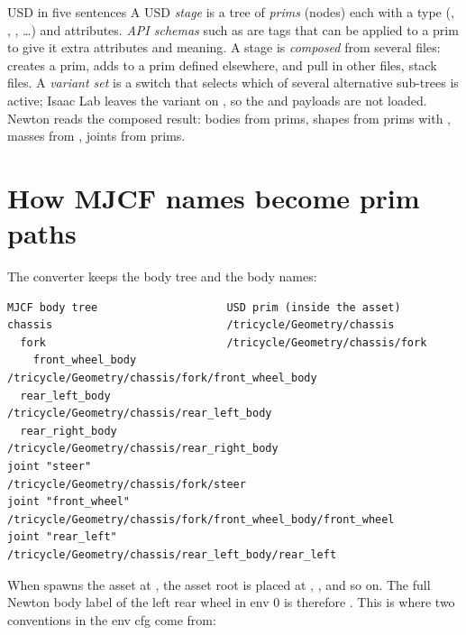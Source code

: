 \begin{isaacbox}{USD in five sentences}
A USD \emph{stage} is a tree of \emph{prims} (nodes) each with a type
(, , , \ldots) and
attributes. \emph{API schemas} such as  are tags that
can be applied to a prim to give it extra attributes and meaning. A stage is
\emph{composed} from several files:  creates a prim,
 adds to a prim defined elsewhere,  and
 pull in other files,  stack files. A
\emph{variant set} is a switch that selects which of several alternative
sub-trees is active; Isaac Lab leaves the  variant on
, so the  and  payloads are not
loaded. Newton reads the composed result: bodies from
 prims, shapes from prims with
, masses from , joints from
 prims.
\end{isaacbox}

\section{How MJCF names become prim paths}
\label{sec:prim_paths}

The converter keeps the body tree and the body names:

\begin{lstlisting}[style=plain,numbers=none]
MJCF body tree                    USD prim (inside the asset)
chassis                           /tricycle/Geometry/chassis
  fork                            /tricycle/Geometry/chassis/fork
    front_wheel_body              /tricycle/Geometry/chassis/fork/front_wheel_body
  rear_left_body                  /tricycle/Geometry/chassis/rear_left_body
  rear_right_body                 /tricycle/Geometry/chassis/rear_right_body
joint "steer"                     /tricycle/Geometry/chassis/fork/steer
joint "front_wheel"               /tricycle/Geometry/chassis/fork/front_wheel_body/front_wheel
joint "rear_left"                 /tricycle/Geometry/chassis/rear_left_body/rear_left
\end{lstlisting}

When  spawns the asset at
, the asset root
 is placed at ,
, and so on. The full Newton body label of the
left rear wheel in env 0 is therefore
. This is
where two conventions in the env cfg come from:

